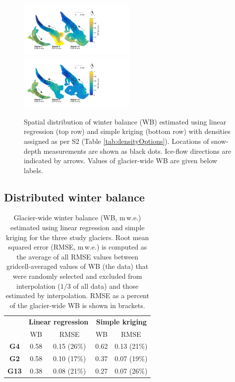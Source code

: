 \documentclass[review,oneside, letterpaper]{igs} %
\begin{document}
\begin{figure}
	\centering
	\includegraphics[width =0.5\textwidth]{LR_map.pdf}\\
    \includegraphics[width =0.5\textwidth]{SK_map.pdf}\\
	\caption{Spatial distribution of winter balance (WB) estimated using linear regression (top row) and simple kriging (bottom row) with densities assigned as per S2 (Table \ref{tab:densityOptions}). Locations of snow-depth measurements are shown as black dots. Ice-flow directions are indicated by arrows. Values of glacier-wide WB are given below labels.}
	\label{fig:LR_SK_map}
\end{figure}


\subsection{Distributed winter balance}

 \begin{table}[]
\centering
\caption{Glacier-wide winter balance (WB, m\,w.e.) estimated using linear regression and simple kriging for the three study glaciers. Root mean squared error (RMSE, m\,w.e.) is computed as the average of all RMSE values between gridcell-averaged values of WB (the data) that were randomly selected and excluded from interpolation ($1/3$ of all data) and those estimated by interpolation. RMSE as a percent of the glacier-wide WB is shown in brackets.}
\label{tab:WSMB&RMSE}
\begin{tabular}{c|cc|cc}
 & \multicolumn{2}{c|}{\textbf{Linear regression}} & \multicolumn{2}{c}{\textbf{Simple kriging}} \\
 & WB & RMSE & WB & RMSE \\ \hline
\textbf{G4} & 0.58 & 0.15 (26\%) & 0.62 & 0.13 (21\%) \\
\textbf{G2} & 0.58 & 0.10 (17\%) & 0.37 & 0.07 (19\%) \\
\textbf{G13} & 0.38 & 0.08 (21\%) & 0.27 & 0.07 (26\%)
\end{tabular}
\end{table}
\end{document}

